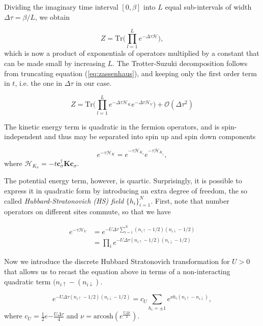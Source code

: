 \documentclass[10pt, twocolumn, twoside]{article}
\begin{document}
Dividing the imaginary time interval $[0, \beta ]$ into $L$ equal sub-intervals of width $\Delta \tau = \beta / L$, we obtain

\begin{equation}
Z = \text{Tr} \bigg( \prod_{l=1}^L e^{-\Delta\tau \mathcal{H} } \bigg) ,
\end{equation}
which is now a product of exponentials of operators multiplied by a constant that can be made small by increasing $L$. The Trotter-Suzuki decomposition follows from truncating equation (\ref{eq:zassenhaus}), and keeping only the first order term in $t$, i.e. the one in $\Delta \tau$ in our case.

\begin{equation}\label{eq:Z_propagator}
Z = \text{Tr} \bigg( \prod_{l=1}^L e^{-\Delta\tau \mathcal{H}_K } e^{-\Delta\tau \mathcal{H}_V } \bigg) + \mathcal{O}(\Delta \tau^2) 
\end{equation}

The kinetic energy term is quadratic in the fermion operators, and is spin-independent and thus may be separated into spin up and spin down components

\begin{equation}
e^{-\tau \mathcal{H}_K} = e^{-\tau \mathcal{H}_{K_\uparrow}} e^{-\tau \mathcal{H}_{K_\downarrow}} ,
\end{equation}
where $\mathcal{H}_{K_\sigma} = -t \bm c_\sigma^\dagger \bm K  \bm c_\sigma$.

The potential energy term, however, is quartic. Surprisingly, it is possible to express it in quadratic form by introducing an extra degree of freedom, the so called \emph{Hubbard-Stratonovich (HS) field} $\{h_i\}_{i=1}^N$. First, note that number operators on different sites commute, so that we have

\begin{equation}
\begin{split}
e^{-\tau \mathcal{H}_V} &= e^{-U \Delta\tau \sum_{i=1}^N (n_{i\uparrow} - 1/2 ) (n_{i\downarrow} - 1/2 )} \\
&= \prod_i e^{-U \Delta\tau (n_{i\uparrow} - 1/2 ) (n_{i\downarrow} - 1/2 )}
\end{split}
\end{equation}

Now we introduce the discrete Hubbard Stratonovich transformation for $U > 0$ that allows us to recast the equation above in terms of a non-interacting quadratic term $(n_{i\uparrow} - (n_{i\downarrow} )$.

\begin{equation}\label{eq:discreteHS}
e^{-U \Delta\tau (n_{i\uparrow} - 1/2 ) (n_{i\downarrow} - 1/2 )} = c_U \sum_{h_i = \pm 1} e^{\nu h_i (n_{i\uparrow} - n_{i\downarrow} )},
\end{equation}
where $c_U = \frac{1}{2} e{-\frac{U\Delta \tau}{4}}$ and $\nu = \text{arcosh} ( e^{\frac{U\Delta\tau}{2}})$.
\end{document}
